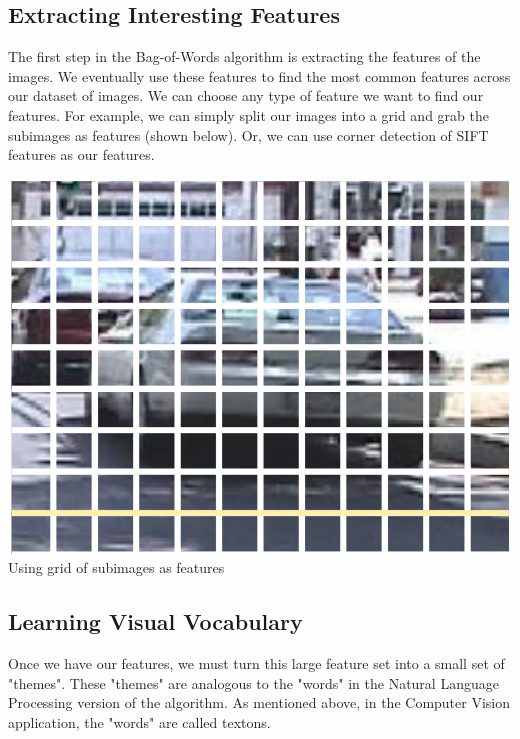 \documentclass{article}
\begin{document}
\subsection{Extracting Interesting Features}
The first step in the Bag-of-Words algorithm is extracting the features of the images. We eventually use these features to find the most common features across our dataset of images. We can choose any type of feature we want to find our features. For example, we can simply split our images into a grid and grab the subimages as features (shown below). Or, we can use corner detection of SIFT features as our features.
\begin{center}
\includegraphics[scale=0.5]{grid_features.png}\\
Using grid of subimages as features \cite{slides}
\end{center}

\subsection{Learning Visual Vocabulary}
Once we have our features, we must turn this large feature set into a small set of "themes". These "themes" are analogous to the "words" in the Natural Language Processing version of the algorithm. As mentioned above, in the Computer Vision application, the "words" are called textons.
\end{document}
